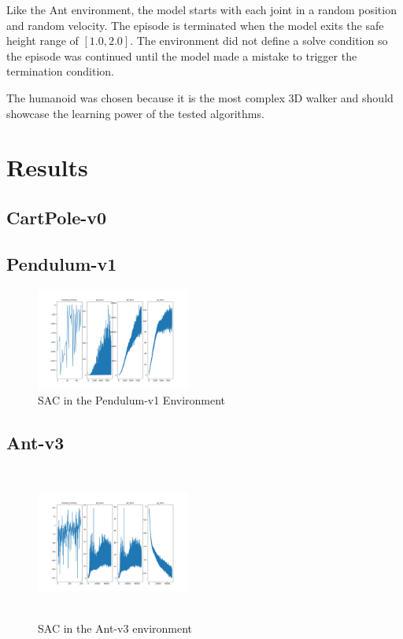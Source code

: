 \documentclass[conference]{IEEEtran}
\begin{document}
Like the Ant environment, the model starts with each joint in a random position and random velocity. The episode is
terminated when the model exits the safe height range of $[1.0, 2.0]$. The environment did not define a solve condition
so the episode was continued until the model made a mistake to trigger the termination condition.

The humanoid was chosen because it is the most complex 3D walker and should showcase the learning power of the tested
algorithms.

\section{Results}

\blindtext

\subsection{CartPole-v0}

\blindtext

\subsection{Pendulum-v1}

\begin{figure}
    \includegraphics[width=0.45\textwidth]{sac-pendulum}
    \caption{SAC in the Pendulum-v1 Environment}
\end{figure}

\blindtext

\subsection{Ant-v3}

\begin{figure}
    \includegraphics[width=0.45\textwidth, height=5cm]{sac-ant}
    \caption{SAC in the Ant-v3 environment}
\end{figure}
\end{document}
